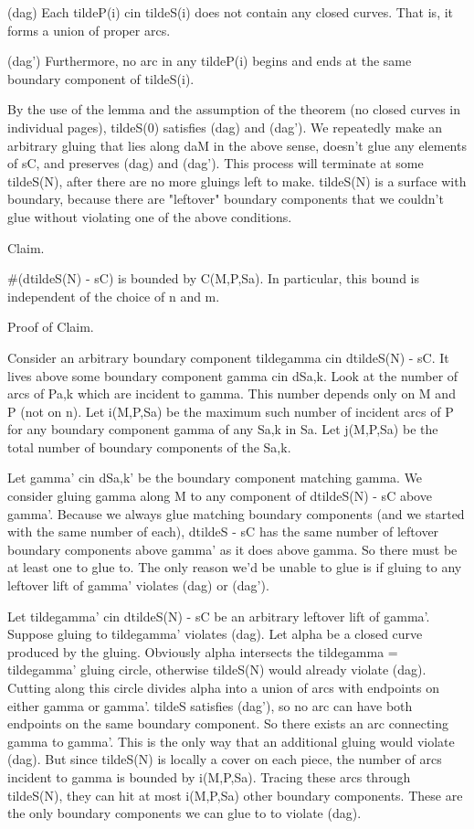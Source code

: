 \documentclass[12pt]{amsart}
\theoremstyle{definition}
\theoremstyle{remark}
\begin{document}
(dag) Each tildeP(i) cin tildeS(i) does not contain any closed curves. That is,
it forms a union of proper arcs.

(dag') Furthermore, no arc in any tildeP(i) begins and ends at the same
boundary component of tildeS(i).

By the use of the lemma and the assumption of the theorem (no closed curves in
individual pages), tildeS(0) satisfies (dag) and (dag'). We repeatedly make an
arbitrary gluing that lies along daM in the above sense, doesn't glue any
elements of sC, and preserves (dag) and (dag').  This process will terminate at
some tildeS(N), after there are no more gluings left to make. tildeS(N) is
a surface with boundary, because there are "leftover" boundary components that
we couldn't glue without violating one of the above conditions.

Claim.

#(dtildeS(N) - sC) is bounded by C(M,P,Sa).  In particular, this bound is
independent of the choice of n and m.

Proof of Claim.

Consider an arbitrary boundary component tildegamma cin dtildeS(N) - sC.  It
lives above some boundary component gamma cin dSa,k. Look at the number of arcs
of Pa,k which are incident to gamma. This number depends only on M and P (not
on n). Let i(M,P,Sa) be the maximum such number of incident arcs of P for any
boundary component gamma of any Sa,k in Sa. Let j(M,P,Sa) be the total number
of boundary components of the Sa,k.

Let gamma' cin dSa,k' be the boundary component matching gamma. We consider
gluing gamma along M to any component of dtildeS(N) - sC above gamma'.  Because
we always glue matching boundary components (and we started with the same
number of each), dtildeS - sC has the same number of leftover boundary
components above gamma' as it does above gamma. So there must be at least one
to glue to.  The only reason we'd be unable to glue is if gluing to any
leftover lift of gamma' violates (dag) or (dag').

Let tildegamma' cin dtildeS(N) - sC be an arbitrary leftover lift of gamma'.
Suppose gluing to tildegamma' violates (dag). Let alpha be a closed curve
produced by the gluing.  Obviously alpha intersects the tildegamma
= tildegamma' gluing circle, otherwise tildeS(N) would already violate (dag).
Cutting along this circle divides alpha into a union of arcs with endpoints on
either gamma or gamma'.  tildeS satisfies (dag'), so no arc can have both
endpoints on the same boundary component. So there exists an arc connecting
gamma to gamma'. This is the only way that an additional gluing would violate
(dag). But since tildeS(N) is locally a cover on each piece, the number of arcs
incident to gamma is bounded by i(M,P,Sa). Tracing these arcs through
tildeS(N), they can hit at most i(M,P,Sa) other boundary components. These are
the only boundary components we can glue to to violate (dag).
\end{document}
